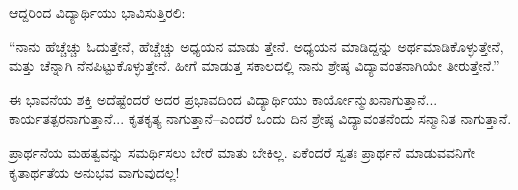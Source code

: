 ಆದ್ದರಿಂದ ವಿದ್ಯಾರ್ಥಿಯು ಭಾವಿಸುತ್ತಿರಲಿ:

\begin{myquote}
“ನಾನು ಹೆಚ್ಚೆಚ್ಚು ಓದುತ್ತೇನೆ, ಹೆಚ್ಚೆಚ್ಚು ಅಧ್ಯಯನ ಮಾಡು ತ್ತೇನೆ. ಅಧ್ಯಯನ ಮಾಡಿದ್ದನ್ನು ಅರ್ಥಮಾಡಿಕೊಳ್ಳುತ್ತೇನೆ, ಮತ್ತು ಚೆನ್ನಾಗಿ ನೆನಪಿಟ್ಟುಕೊಳ್ಳುತ್ತೇನೆ. ಹೀಗೆ ಮಾಡುತ್ತ ಸಕಾಲದಲ್ಲಿ ನಾನು ಶ್ರೇಷ್ಠ ವಿದ್ಯಾವಂತನಾಗಿಯೇ ತೀರುತ್ತೇನೆ.”
\end{myquote}

ಈ ಭಾವನೆಯ ಶಕ್ತಿ ಅದೆಷ್ಟೆಂದರೆ ಅದರ ಪ್ರಭಾವದಿಂದ ವಿದ್ಯಾರ್ಥಿಯು ಕಾರ್ಯೋನ್ಮುಖನಾಗುತ್ತಾನೆ... ಕಾರ್ಯತತ್ಪರನಾಗುತ್ತಾನೆ... ಕೃತಕೃತ್ಯ ನಾಗುತ್ತಾನೆ–ಎಂದರೆ ಒಂದು ದಿನ ಶ್ರೇಷ್ಠ ವಿದ್ಯಾವಂತನೆಂದು ಸನ್ಮಾನಿತ ನಾಗುತ್ತಾನೆ.

\delimiter

ಪ್ರಾರ್ಥನೆಯ ಮಹತ್ವವನ್ನು ಸಮರ್ಥಿಸಲು ಬೇರೆ ಮಾತು ಬೇಕಿಲ್ಲ. ಏಕೆಂದರೆ ಸ್ವತಃ ಪ್ರಾರ್ಥನೆ ಮಾಡುವವನಿಗೇ ಕೃತಾರ್ಥತೆಯ ಅನುಭವ ವಾಗುವುದಲ್ಲ!

\delimiter

